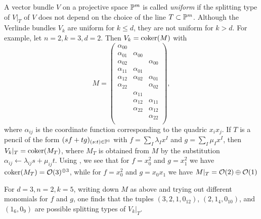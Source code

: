 \begin{example}
	A vector bundle $V$ on a projective space $\mathbb{P}^m$ is called \emph{uniform} if the splitting type of $V|_T$ of $V$ does not depend on the choice of the line $T\subset \mathbb{P}^m$. Although the Verlinde bundles $V_k$ are uniform for $k\leq d$, they are not uniform for $k>d$. For example, let $n=2,k=3,d=2$. Then $V_k = \operatorname{coker}(M)$ with
	\[
		M = \begin{pmatrix}
			\alpha_{00} & & \\
			\alpha_{01} & \alpha_{00} & \\
			\alpha_{02} & & \alpha_{00} \\
			\alpha_{11} & \alpha_{01} & \\
			\alpha_{12} & \alpha_{02} & \alpha_{01} \\
			\alpha_{22} & & \alpha_{02} \\
			& \alpha_{11} & \\
			& \alpha_{12} & \alpha_{11} \\
			& \alpha_{22} & \alpha_{12} \\
			& & \alpha_{22} \\ 
		\end{pmatrix}, 
	\]
	where $\alpha_{ij}$ is the coordinate function corresponding to the quadric $x_i x_j$. If $T$ is a pencil of the form $(sf + tg)_{(s:t)\in\mathbb{P}^1}$ with $f=\sum_I \lambda_I x^I$ and $g = \sum_I \mu_I x^I$, then $V_k|_T = \operatorname{coker}(M_T)$, where $M_T$ is obtained from $M$ by the substitution $\alpha_{ij} \leftarrow \lambda_{ij} s + \mu_{ij} t$. Using , we see that for $f = x_0^2$ and $g=x_1^2$ we have $\operatorname{coker}(M_T) = \mathcal{O}(3)^{\oplus 3}$, while for $f=x_0^2$ and $g=x_0 x_1$ we have $M|_T = \mathcal{O}(2) \oplus \mathcal{O}(1)$
\end{example}

\begin{example}
	For $d=3, n=2, k=5$, writing down $M$ as above and trying out different monomials for $f$ and $g$, one finds that the tuples $(3,2,1,0_{12})$, $(2,1_{4},0_{10})$, and $(1_{6},0_{9})$ are possible splitting types of $V_k|_T$.
\end{example}